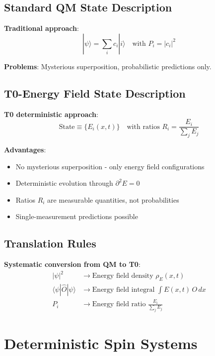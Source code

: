 \documentclass[12pt,a4paper]{article}
\newcommand{\Efield}{E}
\begin{document}
	\subsection{Standard QM State Description}
	
	\textbf{Traditional approach}:
	\begin{equation}
		|\psi\rangle = \sum_i c_i |i\rangle \quad \text{with } P_i = |c_i|^2
	\end{equation}
	
	\textbf{Problems}: Mysterious superposition, probabilistic predictions only.
	
	\subsection{T0-Energy Field State Description}
	
	\textbf{T0 deterministic approach}:
	\begin{equation}
		\boxed{\text{State} \equiv \{\Efield_i(x,t)\} \quad \text{with ratios } R_i = \frac{\Efield_i}{\sum_j \Efield_j}}
	\end{equation}
	
	\textbf{Advantages}: 
	\begin{itemize}
		\item No mysterious superposition - only energy field configurations
		\item Deterministic evolution through $\partial^2 \Efield = 0$
		\item Ratios $R_i$ are measurable quantities, not probabilities
		\item Single-measurement predictions possible
	\end{itemize}
	
	\subsection{Translation Rules}
	
	\textbf{Systematic conversion from QM to T0}:
	\begin{align}
		|\psi|^2 &\rightarrow \text{Energy field density } \rho_E(x,t) \\
		\langle\psi|\hat{O}|\psi\rangle &\rightarrow \text{Energy field integral } \int \Efield(x,t) \, O \, dx \\
		P_i &\rightarrow \text{Energy field ratio } \frac{\Efield_i}{\sum_j \Efield_j}
	\end{align}
	
	\section{Deterministic Spin Systems}
	
\end{document}
